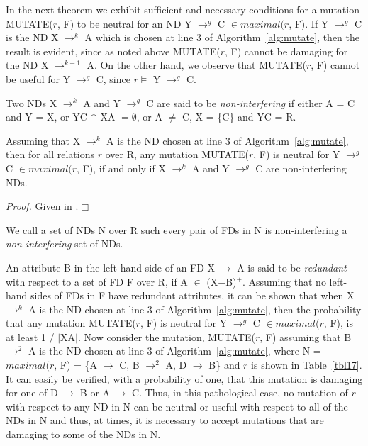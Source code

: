 \medskip

In the next theorem we exhibit sufficient and necessary conditions 
for a mutation MUTATE($r$, F) to be neutral 
for an ND Y $\to^g$ C $\in maximal(r$, F). If Y $\to^g$ C is the ND 
X $\to^k$ A which is chosen at line 3 of Algorithm~\ref{alg:mutate},
then the result is evident, since as noted above MUTATE($r$, F) 
cannot be damaging for the ND X $\to^{k-1}$ A.
On the other hand, we observe that MUTATE($r$, F) cannot be useful 
for Y $\to^g$ C, since $r \models$ Y $\to^g$ C.


\begin{definition}
\begin{rm}
Two NDs X $\to^k$ A and Y $\to^g$ C are said to be {\em non-interfering} if 
either A = C and Y = X, or YC $\cap$ XA $= \emptyset$, 
or A $\not=$ C, X = \{C\} and YC = R.
\end{rm}
\end{definition}
\medskip

\begin{theorem}\label{theorem:neutral}
\begin{rm}
Assuming that X $\to^k$ A is the ND chosen at line 3 of 
Algorithm~\ref{alg:mutate}, then for all relations $r$ over R,
any mutation MUTATE($r$, F) is neutral for Y $\to^g$ C $\in maximal(r$, F),
if and only if X $\to^k$ A and Y $\to^g$ C are non-interfering NDs.
\end{rm}
\end{theorem}
{\em Proof.} 
Given in \cite{cl96}.$\Box$
\medskip


We call a set of NDs N over R such every pair of FDs in N is non-interfering a
{\em non-interfering} set of NDs.

\medskip

An attribute B in the left-hand side of an FD X $\to$ A is said to be 
{\em redundant} with respect to a set of FD F over R, if A $\in$ (X$-$B)${}^+$.
Assuming that no left-hand sides of FDs in F have redundant attributes,
it can be shown that when X $\to^k$ A is the ND chosen at line 3 of 
Algorithm~\ref{alg:mutate}, then the probability that any mutation MUTATE($r$, F)
is neutral for Y $\to^g$ C $\in maximal(r$, F), is at least 1 / $\mid$XA$\mid$.
Now consider the mutation, MUTATE($r$, F) assuming that 
B $\to^2$ A is the ND chosen at line 3 of Algorithm~\ref{alg:mutate},
where N = $maximal(r$, F) = \{A $\to$ C, B $\to^2$ A, D $\to$ B\}
and $r$ is shown in Table~\ref{tbl17}.
It can easily be verified, with a probability of one, that this mutation is 
damaging for one of D $\to$ B or A $\to$ C.
Thus, in this pathological case, no mutation of $r$ with respect to 
any ND in N can be neutral or useful with respect to all of the NDs in N
and thus, at times, it is necessary to accept mutations that are damaging 
to some of the NDs in N. 


